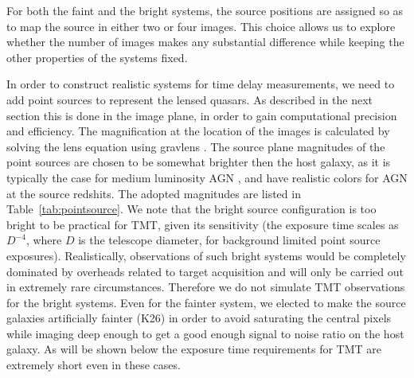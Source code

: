 \documentclass[a4paper,11pt]{article}
\begin{document}
For both the faint and the bright systems, the source positions are
assigned so as to map the source in either two or four images. This
choice allows us to explore whether the number of images makes any
substantial difference while keeping the other properties of the
systems fixed.

In order to construct realistic systems for time delay measurements,
we need to add point sources to represent the lensed quasars. As
described in the next section this is done in the image plane, in
order to gain computational precision and efficiency. The
magnification at the location of the images is calculated by solving
the lens equation using gravlens \cite{2011ascl.soft02003K}. The
source plane magnitudes of the point sources are chosen to be somewhat
brighter then the host galaxy, as it is typically the case for medium
luminosity AGN
\citep[e.g.,][]{Bennert++11}, and have realistic colors for AGN at the
source redshits. The adopted magnitudes are listed in
Table~\ref{tab:pointsource}.  We note that the bright source
configuration is too bright to be practical for TMT, given its
sensitivity (the exposure time scales as $D^{-4}$, where $D$ is the
telescope diameter, for background limited point source
exposures). Realistically, observations of such bright systems would
be completely dominated by overheads related to target acquisition and
will only be carried out in extremely rare circumstances. Therefore we
do not simulate TMT observations for the bright systems. Even for the
fainter system, we elected to make the source galaxies artificially
fainter (K26) in order to avoid saturating the central pixels while
imaging deep enough to get a good enough signal to noise ratio on the
host galaxy. As will be shown below the exposure time requirements for
TMT are extremely short even in these cases.

\end{document}
